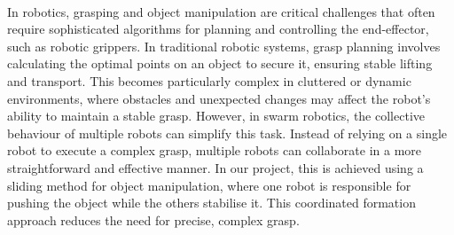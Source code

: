 \paragraph*{}
In robotics, grasping and object manipulation are critical challenges that often require sophisticated algorithms for planning and controlling the end-effector, such as robotic grippers. In traditional robotic systems, grasp planning involves calculating the optimal points on an object to secure it, ensuring stable lifting and transport. This becomes particularly complex in cluttered or dynamic environments, where obstacles and unexpected changes may affect the robot’s ability to maintain a stable grasp. However, in swarm robotics, the collective behaviour of multiple robots can simplify this task. Instead of relying on a single robot to execute a complex grasp, multiple robots can collaborate in a more straightforward and effective manner. In our project, this is achieved using a sliding method for object manipulation, where one robot is responsible for pushing the object while the others stabilise it. This coordinated formation approach reduces the need for precise, complex grasp.
